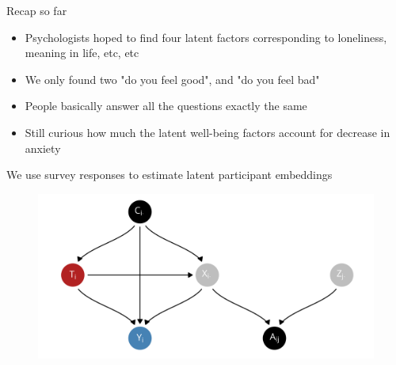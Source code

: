 \documentclass[aspectratio=169]{beamer}
\theoremstyle{remark}
\begin{document}
\begin{frame}{Recap so far}

    \begin{itemize}
        \item Psychologists hoped to find four latent factors corresponding to loneliness, meaning in life, etc, etc
        \item We only found two "do you feel good", and "do you feel bad"
        \item People basically answer all the questions exactly the same
        \item Still curious how much the latent well-being factors account for decrease in anxiety
    \end{itemize}

\end{frame}

\begin{frame}{We use survey responses to estimate latent participant embeddings}
    \centering
    \begin{figure}
        \includegraphics[width=\textwidth]{figures/dags/bipartite-mediation.png}
    \end{figure}
\end{frame}
\end{document}
